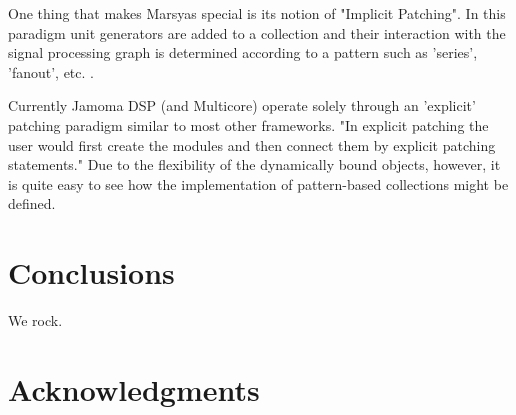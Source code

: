 \documentclass[twoside,a4paper]{article}
\begin{document}
One thing that makes Marsyas special is its notion of "Implicit Patching".  In this paradigm unit generators are added to a collection and their interaction with the signal processing graph is determined according to a pattern such as 'series', 'fanout', etc. \cite{Bray:2005}.

Currently Jamoma DSP (and Multicore) operate solely through an 'explicit' patching paradigm similar to most other frameworks.  "In explicit patching the user would first create the modules and then connect them by explicit patching statements."  Due to the flexibility of the dynamically bound objects, however, it is quite easy to see how the implementation of pattern-based collections might be defined.



\section{Conclusions}
We rock.

%
%
%
%




\section{Acknowledgments}
\end{document}
